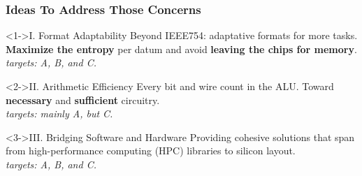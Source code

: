 \begin{frame}
    \frametitle{Ideas To Address Those Concerns}
    \begin{block}<1->{I. Format Adaptability}
	    Beyond IEEE754: adaptative formats for more tasks. \textbf{Maximize the entropy} per datum and avoid \textbf{leaving the chips for memory}.
	    \\ \textit{targets: A, B, and C.}
    \end{block}

    \begin{block}<2->{II. Arithmetic Efficiency}
	    Every bit and wire count in the ALU. Toward \textbf{necessary} and \textbf{sufficient} circuitry.
	    \\ \textit{targets: mainly A, but C.}
    \end{block}

    \begin{block}<3->{III. Bridging Software and Hardware}
	    Providing cohesive solutions that span from high-performance computing (HPC) libraries to silicon layout.
	    \\ \textit{targets: A, B, and C.}
    \end{block}
\end{frame}

%
%
%
%
%
%

